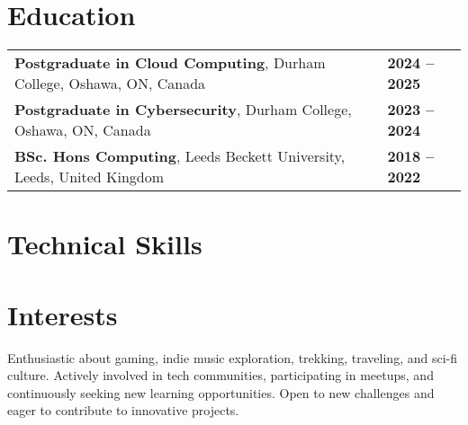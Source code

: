 \documentclass[11pt,a4paper,sans]{moderncv}
\newcommand{\sectionseparator}{\vspace{5pt}\par\noindent\makebox[\linewidth]{\rule{\textwidth}{0.4pt}}\vspace{5pt}}
\begin{document}
\sectionseparator

\section{Education}
\begin{tabular}{@{}p{} p{}@{}}
    \textbf{Postgraduate in Cloud Computing}, Durham College, Oshawa, ON, Canada & \hfill \textbf {2024 -- 2025} \\
    \textbf{Postgraduate in Cybersecurity}, Durham College, Oshawa, ON, Canada & \hfill \textbf {2023 -- 2024} \\
    \textbf{BSc. Hons Computing}, Leeds Beckett University, Leeds, United Kingdom & \hfill \textbf {2018 -- 2022} \\
\end{tabular}

\sectionseparator

\section{Technical Skills}


\sectionseparator

\section{Interests}
Enthusiastic about gaming, indie music exploration, trekking, traveling, and sci-fi culture. Actively involved in tech communities, participating in meetups, and continuously seeking new learning opportunities. Open to new challenges and eager to contribute to innovative projects.
\end{document}
